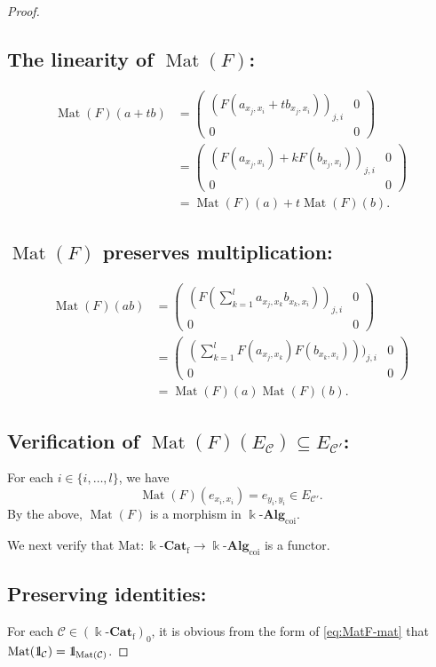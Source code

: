 \documentclass{surv-l}
\numberwithin{equation}{chapter}
\numberwithin{figure}{chapter}
\theoremstyle{plain}
\theoremstyle{definition}
\theoremstyle{remark}
\newcommand{\id}{1\kern-.25em{\text{{\rm l}}}}
\newcommand{\kCat}{\Bbbk\text{-}\mathbf{Cat}}
\DeclareMathOperator{\Mat}{Mat}
\begin{document}
\begin{proof}
\subsection*{The linearity of $\Mat(F)$:}
\[
\begin{aligned}
\Mat(F)(a+ tb) &= \begin{pmatrix} (F(a_{x_j,x_i} + tb_{x_j,x_i}))_{j,i} & 0\\0 & 0 \end{pmatrix}\\
& = \begin{pmatrix} (F(a_{x_j,x_i}) + kF(b_{x_j,x_i}))_{j,i} & 0\\0 & 0 \end{pmatrix}\\
& =\Mat(F)(a)+t\Mat(F)(b).
\end{aligned}
\]


\subsection*{$\Mat(F)$ preserves multiplication:}
\[
\begin{aligned}
\Mat(F)(ab) &= \begin{pmatrix} (F(\sum_{k=1}^l a_{x_j,x_k}b_{x_k,x_i}))_{j,i} & 0\\0 & 0 \end{pmatrix}\\
&= \begin{pmatrix} (\sum_{k=1}^l F(a_{x_j,x_k})F(b_{x_k,x_i})))_{j,i} & 0\\0 & 0 \end{pmatrix}\\
&= \Mat(F)(a)\Mat(F)(b).
\end{aligned}
\]


\subsection*{Verification of $\Mat(F)(E_{{\mathcal{C}}}) \subseteq E_{{\mathcal{C}}'}$:}
For each $i \in \{i,\dots, l\}$, we have
\[
\Mat(F)(e_{x_i,x_i}) = e_{y_i,y_i} \in E_{{\mathcal{C}}'}.
\]
By the above, $\Mat(F)$ is a morphism in $\Bbbk\text{-}\mathbf{Alg}_{\mathrm{coi}}$.

We next verify that $\mathrm{Mat} \colon \kCat_{\mathrm{f}} \to \Bbbk\text{-}\mathbf{Alg}_{\mathrm{coi}}$ is a functor.


\subsection*{Preserving identities:}
For each ${\mathcal{C}} \in (\kCat_{\mathrm{f}})_0$,
it is obvious from the form of \eqref{eq:MatF-mat}
that $\Mat(\id_{{\mathcal{C}}}) = \id_{\Mat({\mathcal{C}})}$.



\end{proof}
\end{document}
